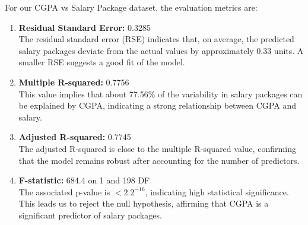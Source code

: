 \begin{example}
    For our CGPA vs Salary Package dataset, the evaluation metrics are: 
    
    \begin{enumerate}
        \item \textbf{Residual Standard Error:} 0.3285 \\
        The residual standard error (RSE) indicates that, on average, the predicted salary packages deviate from the actual values by approximately 0.33 units. A smaller RSE suggests a good fit of the model.
        
        \item \textbf{Multiple R-squared:} 0.7756 \\
        This value implies that about 77.56\% of the variability in salary packages can be explained by CGPA, indicating a strong relationship between CGPA and salary.
        
        \item \textbf{Adjusted R-squared:} 0.7745 \\
        The adjusted R-squared is close to the multiple R-squared value, confirming that the model remains robust after accounting for the number of predictors.
        
        \item \textbf{F-statistic:} 684.4 on 1 and 198 DF \\
        The associated p-value is $< 2.2^{-16}$, indicating high statistical significance. This leads us to reject the null hypothesis, affirming that CGPA is a significant predictor of salary packages.
    \end{enumerate}
\end{example}